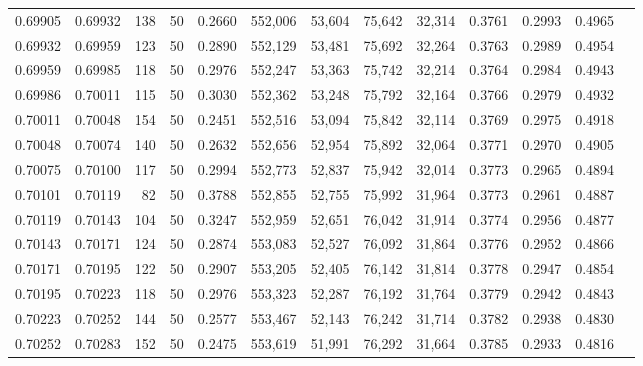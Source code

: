 \begin{tabular}{rrrrrrrrrrrrr}
0.69905 & 0.69932 &   138 &  50 &                                     0.2660 & 552,006 &  53,604 &  75,642 &  32,314 & 0.3761 & 0.2993 & 0.4965 \\
0.69932 & 0.69959 &   123 &  50 &                                     0.2890 & 552,129 &  53,481 &  75,692 &  32,264 & 0.3763 & 0.2989 & 0.4954 \\
0.69959 & 0.69985 &   118 &  50 &                                     0.2976 & 552,247 &  53,363 &  75,742 &  32,214 & 0.3764 & 0.2984 & 0.4943 \\
0.69986 & 0.70011 &   115 &  50 &                                     0.3030 & 552,362 &  53,248 &  75,792 &  32,164 & 0.3766 & 0.2979 & 0.4932 \\
0.70011 & 0.70048 &   154 &  50 &                                     0.2451 & 552,516 &  53,094 &  75,842 &  32,114 & 0.3769 & 0.2975 & 0.4918 \\
0.70048 & 0.70074 &   140 &  50 &                                     0.2632 & 552,656 &  52,954 &  75,892 &  32,064 & 0.3771 & 0.2970 & 0.4905 \\
0.70075 & 0.70100 &   117 &  50 &                                     0.2994 & 552,773 &  52,837 &  75,942 &  32,014 & 0.3773 & 0.2965 & 0.4894 \\
0.70101 & 0.70119 &    82 &  50 &                                     0.3788 & 552,855 &  52,755 &  75,992 &  31,964 & 0.3773 & 0.2961 & 0.4887 \\
0.70119 & 0.70143 &   104 &  50 &                                     0.3247 & 552,959 &  52,651 &  76,042 &  31,914 & 0.3774 & 0.2956 & 0.4877 \\
0.70143 & 0.70171 &   124 &  50 &                                     0.2874 & 553,083 &  52,527 &  76,092 &  31,864 & 0.3776 & 0.2952 & 0.4866 \\
0.70171 & 0.70195 &   122 &  50 &                                     0.2907 & 553,205 &  52,405 &  76,142 &  31,814 & 0.3778 & 0.2947 & 0.4854 \\
0.70195 & 0.70223 &   118 &  50 &                                     0.2976 & 553,323 &  52,287 &  76,192 &  31,764 & 0.3779 & 0.2942 & 0.4843 \\
0.70223 & 0.70252 &   144 &  50 &                                     0.2577 & 553,467 &  52,143 &  76,242 &  31,714 & 0.3782 & 0.2938 & 0.4830 \\
0.70252 & 0.70283 &   152 &  50 &                                     0.2475 & 553,619 &  51,991 &  76,292 &  31,664 & 0.3785 & 0.2933 & 0.4816 \\

\end{tabular}
